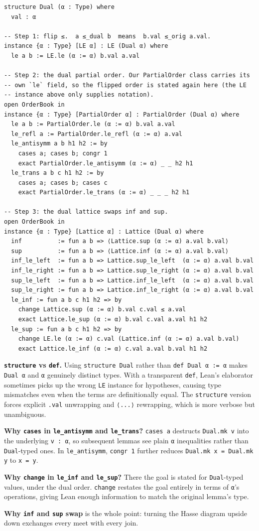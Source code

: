\documentclass[12pt, a4paper, openright]{book}
\theoremstyle{thmstyle}
\theoremstyle{defstyle}
\newcommand{\lc}[1]{\texttt{#1}}
\newenvironment{notebox}{%
  \begin{tcolorbox}[notebox]%
}{\end{tcolorbox}}
\begin{document}
\begin{verbatim}
structure Dual (α : Type) where
  val : α

-- Step 1: flip ≤.  a ≤_dual b  means  b.val ≤_orig a.val.
instance {α : Type} [LE α] : LE (Dual α) where
  le a b := LE.le (α := α) b.val a.val

-- Step 2: the dual partial order. Our PartialOrder class carries its
-- own `le` field, so the flipped order is stated again here (the LE
-- instance above only supplies notation).
open OrderBook in
instance {α : Type} [PartialOrder α] : PartialOrder (Dual α) where
  le a b := PartialOrder.le (α := α) b.val a.val
  le_refl a := PartialOrder.le_refl (α := α) a.val
  le_antisymm a b h1 h2 := by
    cases a; cases b; congr 1
    exact PartialOrder.le_antisymm (α := α) _ _ h2 h1
  le_trans a b c h1 h2 := by
    cases a; cases b; cases c
    exact PartialOrder.le_trans (α := α) _ _ _ h2 h1

-- Step 3: the dual lattice swaps inf and sup.
open OrderBook in
instance {α : Type} [Lattice α] : Lattice (Dual α) where
  inf          := fun a b => ⟨Lattice.sup (α := α) a.val b.val⟩
  sup          := fun a b => ⟨Lattice.inf (α := α) a.val b.val⟩
  inf_le_left  := fun a b => Lattice.sup_le_left  (α := α) a.val b.val
  inf_le_right := fun a b => Lattice.sup_le_right (α := α) a.val b.val
  sup_le_left  := fun a b => Lattice.inf_le_left  (α := α) a.val b.val
  sup_le_right := fun a b => Lattice.inf_le_right (α := α) a.val b.val
  le_inf := fun a b c h1 h2 => by
    change Lattice.sup (α := α) b.val c.val ≤ a.val
    exact Lattice.le_sup (α := α) b.val c.val a.val h1 h2
  le_sup := fun a b c h1 h2 => by
    change LE.le (α := α) c.val (Lattice.inf (α := α) a.val b.val)
    exact Lattice.le_inf (α := α) c.val a.val b.val h1 h2
\end{verbatim}

\begin{notebox}
  \textbf{\lc{structure} vs \lc{def}.} Using \lc{structure Dual} rather
  than \lc{def Dual α := α} makes \lc{Dual α} and \lc{α} genuinely
  distinct types. With a transparent \lc{def}, Lean's elaborator
  sometimes picks up the wrong \lc{LE} instance for hypotheses, causing
  type mismatches even when the terms are definitionally equal. The
  \lc{structure} version forces explicit \lc{.val} unwrapping and
  \lc{⟨...⟩} rewrapping, which is more verbose but unambiguous.

  \textbf{Why \lc{cases} in \lc{le\_antisymm} and \lc{le\_trans}?}
  \lc{cases a} destructs \lc{Dual.mk v} into the underlying \lc{v : α},
  so subsequent lemmas see plain \lc{α} inequalities rather than
  \lc{Dual}-typed ones. In \lc{le\_antisymm}, \lc{congr 1} further
  reduces \lc{Dual.mk x = Dual.mk y} to \lc{x = y}.

  \textbf{Why \lc{change} in \lc{le\_inf} and \lc{le\_sup}?} There the
  goal is stated for \lc{Dual}-typed values, under the dual order. \lc{change} restates the
  goal entirely in terms of \lc{α}'s operations, giving Lean enough
  information to match the original lemma's type.

  \textbf{Why \lc{inf} and \lc{sup} swap} is the whole point: turning
  the Hasse diagram upside down exchanges every meet with every join.
\end{notebox}
\end{document}
